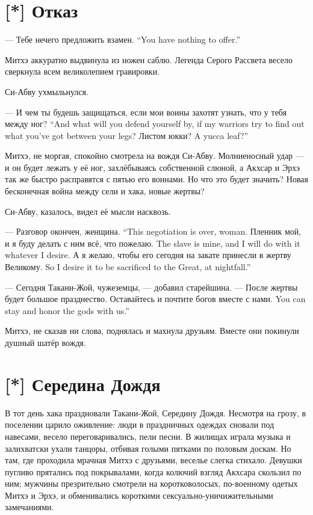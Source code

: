 \section{[*] Отказ}

\textspace

{--- Тебе нечего предложить взамен.}
{``You have nothing to offer.''}

Митхэ аккуратно выдвинула из ножен саблю.
Легенда Серого Рассвета весело сверкнула всем великолепием гравировки.

Си-Абву ухмыльнулся.

{--- И чем ты будешь защищаться, если мои воины захотят узнать, что у тебя между ног?}
{``And what will you defend yourself by, if my warriors try to find out what you've got between your legs?}
{Листом юкки?}
{A yucca leaf?''}

Митхэ, не моргая, спокойно смотрела на вождя Си-Абву.
Молниеносный удар --- и он будет лежать у её ног, захлёбываясь собственной слюной, а Акхсар и Эрхэ так же быстро расправятся с пятью его воинами.
Но что это будет значить?
Новая бесконечная война между сели и хака, новые жертвы?

Си-Абву, казалось, видел её мысли насквозь.

{--- Разговор окончен, женщина.}
{``This negotiation is over, woman.}
{Пленник мой, и я буду делать с ним всё, что пожелаю.}
{The slave is mine, and I will do with it whatever I desire.}
{А я желаю, чтобы его сегодня на закате принесли в жертву Великому.}
{So I desire it to be sacrificed to the Great, at nightfall.''}

--- Сегодня Такани-Жой, чужеземцы, --- добавил старейшина.
--- После жертвы будет большое празднество.
{Оставайтесь и почтите богов вместе с нами.}
{You can stay and honor the gods with us.''}

Митхэ, не сказав ни слова, поднялась и махнула друзьям.
Вместе они покинули душный шатёр вождя.

\section{[*] Середина Дождя}

В тот день хака праздновали Такани-Жой, Середину Дождя.
Несмотря на грозу, в поселении царило оживление: люди в праздничных одеждах сновали под навесами, весело переговаривались, пели песни.
В жилищах играла музыка и залихватски ухали танцоры, отбивая голыми пятками по половым доскам.
Но там, где проходила мрачная Митхэ с друзьями, веселье слегка стихало.
Девушки пугливо прятались под покрывалами, когда колючий взгляд Акхсара скользил по ним;
мужчины презрительно смотрели на коротковолосых, по-военному одетых Митхэ и Эрхэ, и обменивались короткими сексуально-уничижительными замечаниями.

